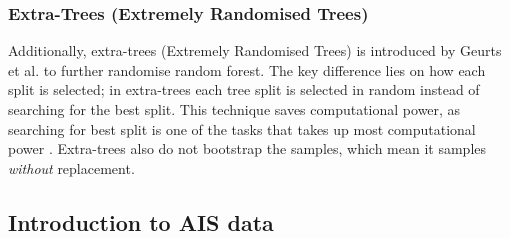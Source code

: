 \subsubsection{Extra-Trees (Extremely Randomised Trees)}\label{et_theo}

Additionally, extra-trees (Extremely Randomised Trees) is introduced by Geurts et al. \cite{Geurts.2006} to further randomise random forest. The key difference lies on how each split is selected; in extra-trees each tree split is selected in random instead of searching for the best split. This technique saves computational power, as searching for best split is one of the tasks that takes up most computational power \cite{Geron.2019}. Extra-trees also do not bootstrap the samples, which mean it samples \emph{without} replacement.\\



\subsection{Introduction to AIS data}\label{ais_theo}


